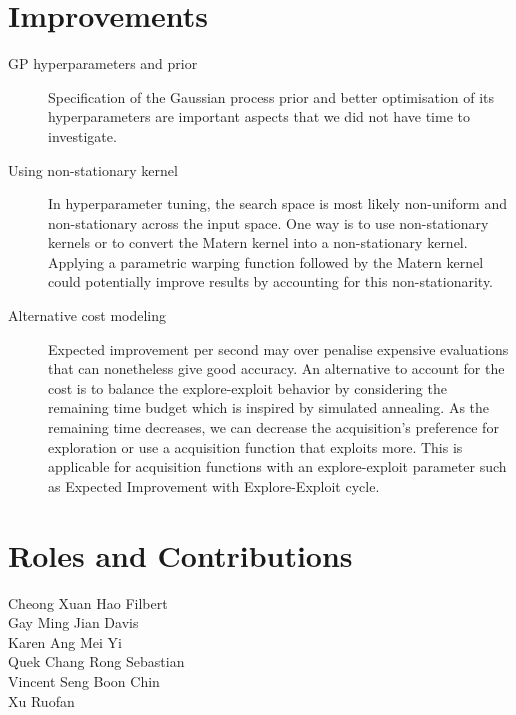 \documentclass[letterpaper]{article}
\begin{document}
\section{Improvements}
\begin{description}
\item [GP hyperparameters and prior] Specification of the Gaussian process prior and better optimisation of its 
hyperparameters are important aspects that we did not have time to investigate.
\item [Using non-stationary kernel] In hyperparameter tuning, the search space is most likely non-uniform and 
non-stationary across the input space. One way is to use non-stationary
kernels or to convert the Matern kernel into a non-stationary kernel.
\cite{shahriari2016taking} Applying a parametric warping
function followed by the Matern kernel could potentially improve results by
accounting for this non-stationarity.
\item [Alternative cost modeling] Expected improvement per second may over penalise expensive evaluations that can nonetheless give good accuracy.
An alternative to account for the cost is to balance the explore-exploit behavior by considering the remaining time budget which is inspired by simulated annealing.
As the remaining time decreases, we can decrease the acquisition's preference for exploration or use a acquisition function that exploits more.
This is applicable for acquisition functions with an explore-exploit parameter such as Expected Improvement with Explore-Exploit cycle.
\end{description}

\section{Roles and Contributions}
\begin{description}
\item [Cheong Xuan Hao Filbert]
\item [Gay Ming Jian Davis]
\item [Karen Ang Mei Yi]
\item [Quek Chang Rong Sebastian]
\item [Vincent Seng Boon Chin]
\item [Xu Ruofan]
\end{description}



\end{document}
